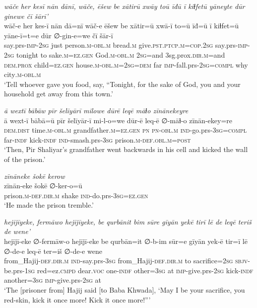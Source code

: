 \ea \label{BP.165}
\textit{wāče her kesī nān dānī, wāče, ēšew be xātirū xwāy toū īđū ī kiɫfetū yāneyte dūr ginewe čī šārī’} \\ 
\gll wāč-e her kes-ī nān dā=nī wāč-e ēšew be xātir=ū xwā-ī to=ū īđ=ū ī kiɫfet=ū yāne-ī=t=e dūr ∅-gin-e=we čī šār-ī \\ 
 say.prs-\textsc{imp-}\textsc{2sg} just person\textsc{.m}\textsc{-obl}\textsc{.m} bread\textsc{.m} give\textsc{.pst}\textsc{.ptcp}\textsc{.m}\textsc{=cop}\textsc{.\textsc{2sg}} say.prs-\textsc{imp-}\textsc{2sg} tonight to sake\textsc{.m}\textsc{=ez.gen} God\textsc{.m}\textsc{-obl}\textsc{.m} \textsc{2sg}=and 3sg.prox\textsc{.dir}\textsc{.m}=and \textsc{dem.prox} child\textsc{=ez.gen} house\textsc{.m}\textsc{-obl}\textsc{.m}\textsc{=\textsc{2sg}}\textsc{=dem} far \textsc{imp-}fall.prs-\textsc{2sg}\textsc{=compl} why city\textsc{.m}\textsc{-obl}\textsc{.m} \\ 
\glt `Tell whoever gave you food, say, “Tonight, for the sake of God, you and your household get away from this town.'
\z 
 
\ea \label{BP.168}
\textit{ā wextī bābāw pīr šelīyārī milowe dūrē leqē māɫo zīnānekeyre} \\ 
\gll ā wext-ī bābā=ū pīr šelīyār-ī mi-l-o=we dūr-ē leq-ē ∅-māɫ-o zīnān-ekey=re \\ 
 \textsc{dem.dist} time\textsc{.m}\textsc{-obl}\textsc{.m} grandfather\textsc{.m}\textsc{=ez.gen} \textsc{pn} \textsc{pn}\textsc{-obl}\textsc{.m} \textsc{ind-}go.prs\textsc{-3sg}\textsc{=compl} far\textsc{-indf} kick\textsc{-indf} \textsc{ind-}smash.prs\textsc{-3sg} prison\textsc{.m}\textsc{-def}\textsc{.obl}\textsc{.m}\textsc{=\textsc{post}} \\ 
\glt `Then, Pir Shaliyar’s grandfather went backwards in his cell and kicked the wall of the prison.'
\z 
 
\ea \label{BP.170}
\textit{zīnāneke šokē kerow} \\ 
\gll zīnān-eke šokē ∅-ker-o=ū \\ 
 prison\textsc{.m}\textsc{-def}\textsc{.dir}\textsc{.m} shake \textsc{ind-}do.prs\textsc{-3sg}\textsc{=ez.gen} \\ 
\glt `He made the prison tremble.'
\z 
 
\ea \label{BP.172}
\textit{hejījīyeke, fermāwo hejījīyeke, be qurbānit bim sūre gīyān yekē tirī lē de leqē teriš de wene’} \\ 
\gll hejījī-eke ∅-fermāw-o hejījī-eke be qurbān=it ∅-b-im sūr=e gīyān yek-ē tir=ī lē ∅-de-e leq-ē ter=iš ∅-de-e wene \\ 
 from\_Hajij\textsc{-def}\textsc{.dir}\textsc{.m} \textsc{ind-}say.prs\textsc{-3sg} from\_Hajij\textsc{-def}\textsc{.dir}\textsc{.m} to sacrifice\textsc{=\textsc{2sg}} \textsc{sbjv-}be.prs\textsc{-\textsc{1sg}} red=ez\textsc{.cmpd} dear.\textsc{voc} one\textsc{-indf} other\textsc{=3sg} at \textsc{imp-}give.prs-\textsc{2sg} kick\textsc{-indf} another\textsc{=3sg} \textsc{imp-}give.prs-\textsc{2sg} at \\ 
\glt `The [prisoner from] Hajij said [to Baba Khwada], ‘May I be your sacrifice, you red-skin, kick it once more! Kick it once more!”'
\z 
 

